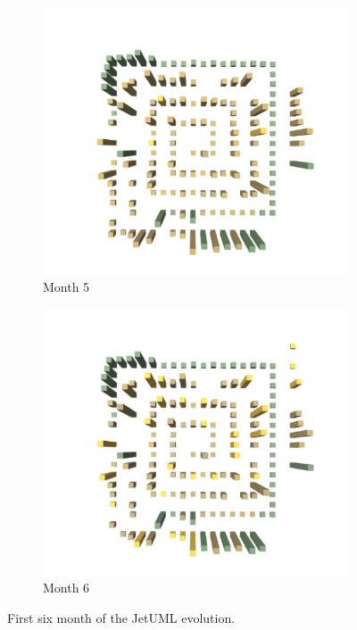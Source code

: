 \begin{figure}[ht]
    \medskip
    \begin{subfigure}{0.48\textwidth}
        \includegraphics[width=\linewidth]{JetUML_V1S5.png}
        \caption{Month 5} \label{fig:JetUML_V1S5}
    \end{subfigure}\hspace*{\fill}
    \begin{subfigure}{0.48\textwidth}
        \includegraphics[width=\linewidth]{JetUML_V1S6.png}
        \caption{Month 6} \label{fig:JetUML_V1S6}
    \end{subfigure}
    
    \caption{First six month of the JetUML evolution.} 
    \label{fig:JetUML_V1}
\end{figure}
\clearpage
